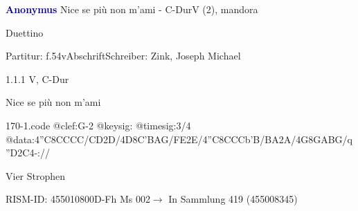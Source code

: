 \documentclass[twocolumn, 12pt]{book}
\begin{document}
\par \vspace{16pt} \textcolor{darkblue}{\textbf{Anonymus  }}\hfillplus{\textbf{[170]}}\newline Nice se più non m'ami - C-Dur\newline V (2), mandora
\par \begin{itshape}[at left, f.54v:] Duettino\end{itshape} 
\par \textcolor{darkblue}{}  Partitur: f.54v\newline Abschrift\newline Schreiber: Zink, Joseph Michael
\par 1.1.1  V, C-Dur\newline \begin{footnotesize} Nice se più non m'ami \end{footnotesize}  
\begin{filecontents*}{170-1.code}
@clef:G-2
@keysig:
@timesig:3/4
@data:4''C8CCCC/{CD}2D/4D8C'BAG/{FE}2E/4''C8CCCb'B/{BA}2A/4G8GABG/q''D2C4-://
\end{filecontents*}
\newline %
\par Vier Strophen
\par RISM-ID: 455010800\newline D-Fh  Ms 002\newline $\rightarrow$ In Sammlung 419 (455008345)
      
\end{document}
